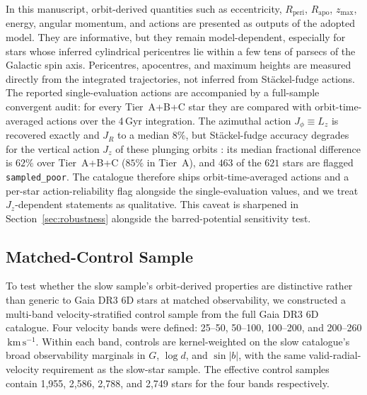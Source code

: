 \documentclass{aa}  %
\newcommand{\kms}{\ensuremath{\,\mathrm{km\,s^{-1}}}\xspace}
\newcommand{\Rperi}{R_{\mathrm{peri}}}
\newcommand{\Rapo}{R_{\mathrm{apo}}}
\newcommand{\zmax}{z_{\mathrm{max}}}
\begin{document}
In this manuscript, orbit-derived quantities such as eccentricity,
$\Rperi$, $\Rapo$, $\zmax$, energy, angular momentum, and actions are
presented as outputs of the adopted model.  They are informative, but
 they remain model-dependent, especially for stars whose inferred
 cylindrical pericentres lie within a few tens of parsecs of the Galactic
 spin axis.
Pericentres, apocentres, and maximum heights are measured directly from
the integrated trajectories, not inferred from St\"ackel-fudge actions.
The reported single-evaluation actions are accompanied by a full-sample
convergent audit: for every Tier~A+B+C star they are compared with
orbit-time-averaged actions over the 4\,Gyr integration.  The azimuthal
action $J_\phi\equiv L_z$ is recovered exactly and $J_R$ to a median
$8\%$, but St\"ackel-fudge accuracy degrades for the vertical action
$J_z$ of these plunging orbits \citep{WrightBinney2026}: its median
fractional difference is $62\%$ over Tier~A+B+C ($85\%$ in Tier~A), and
$463$ of the $621$ stars are flagged \texttt{sampled\_poor}.
The catalogue therefore ships orbit-time-averaged actions and a per-star
action-reliability flag alongside the single-evaluation values, and we
treat $J_z$-dependent statements as qualitative.  This caveat is
sharpened in Section~\ref{sec:robustness} alongside the barred-potential
sensitivity test.

\subsection{Matched-Control Sample} \label{sec:controls}

To test whether the slow sample's orbit-derived properties are distinctive
rather than generic to Gaia DR3 6D stars at matched observability, we
constructed a multi-band velocity-stratified control sample from the full
Gaia DR3 6D catalogue.  Four velocity bands were
defined: 25--50, 50--100, 100--200, and 200--260\kms.  Within each band,
controls are kernel-weighted on the slow catalogue's broad
observability marginals in $G$, $\log d$, and $\sin |b|$, with the same
valid-radial-velocity requirement as the slow-star sample.  The effective
control samples contain 1,955, 2,586, 2,788, and 2,749 stars for the
four bands respectively.
\end{document}
